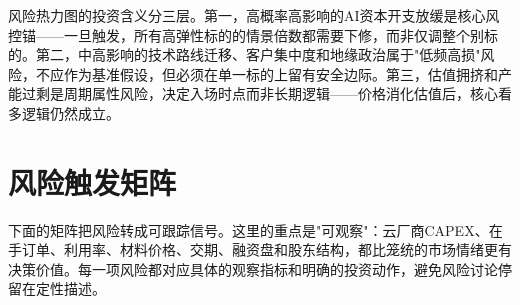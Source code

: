 风险热力图的投资含义分三层。第一，高概率高影响的AI资本开支放缓是核心风控锚——一旦触发，所有高弹性标的的情景倍数都需要下修，而非仅调整个别标的。第二，中高影响的技术路线迁移、客户集中度和地缘政治属于"低频高损"风险，不应作为基准假设，但必须在单一标的上留有安全边际。第三，估值拥挤和产能过剩是周期属性风险，决定入场时点而非长期逻辑——价格消化估值后，核心看多逻辑仍然成立。

\section{风险触发矩阵}

下面的矩阵把风险转成可跟踪信号。这里的重点是"可观察"：云厂商CAPEX、在手订单、利用率、材料价格、交期、融资盘和股东结构，都比笼统的市场情绪更有决策价值。每一项风险都对应具体的观察指标和明确的投资动作，避免风险讨论停留在定性描述。

